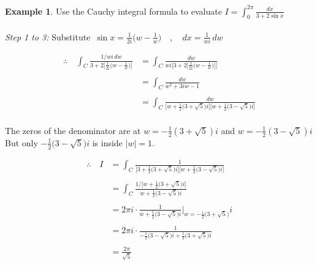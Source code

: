 \documentclass[11pt,a4paper]{article}
\theoremstyle{definition}
\newtheorem{example}[thm]{Example}
\begin{document}
\begin{example}
Use the Cauchy integral formula to evaluate $\displaystyle{I = \int^{2\pi}_0 \frac{dx}{3 + 2\sin x}}$\\


\text{\textcolor{red}{Solution}}\\
\textit{Step 1 to 3:} Substitute $\,\displaystyle{ \sin x = \frac{1}{2i}\Big(w - \frac{1}{w}\Big)\quad  , \quad  dx = \frac{1}{wi}\,dw}$


\begin{align*}
\therefore\quad  \int_C \frac{1/wi \,dw}{3 + 2\Big[\frac{1}{2i}\Big(w - \frac{1}{w}\Big)\Big]} & = \int_C \frac{dw}{wi\Big[3 + 2\Big[\frac{1}{2i}\Big(w - \frac{1}{w}\Big)\Big]\Big]}\\\\\
& = \int_C \frac{dw}{w^2 + 3iw - 1}\\\\
& = \int_C \frac{dw}{\Big[w + \frac{1}{2}\Big(3 + \sqrt{5}\Big)i\Big]\Big[w + \frac{1}{2}\Big( 3 - \sqrt{5}\Big)i\Big]}\\
\end{align*}


The zeros of the denominator are at $w = -\frac{1}{2}(3 + \sqrt{5})i$ and $w = -\frac{1}{2}(3 - \sqrt{5})i$\\

But only $-\frac{1}{2}\big(3 - \sqrt{5}\big)i$ is inside $\left|w\right| = 1$.


\begin{figure}[H]
\centering
{}
\end{figure}















\begin{align*}
\therefore\quad  I & = \int_C \frac{1}{\Big[3 + \frac{1}{2}\Big(3 + \sqrt{5}\Big)i\Big]\Big[w + \frac{1}{2}\Big(3 - \sqrt{5}\Big)i\Big]}\\\\
& = \int_C \frac{1/\Big[w + \frac{1}{2}\Big(3 + \sqrt{5}\Big)i\Big]}{w + \frac{1}{2}\Big(3 - \sqrt{5}\Big)i}\\\\
& = 2\pi i\cdot \frac{1}{w + \frac{1}{2}\Big(3 - \sqrt{5}\Big)i}\Bigg|_{w = -\frac{1}{2}\Big(3 + \sqrt{5}\Big)}i\\\\
& = 2\pi i\cdot \frac{1}{-\frac{1}{2}\Big(3- \sqrt{5}\Big)i + \frac{1}{2}\Big(3 + \sqrt{5}\Big)i}\\\\
& = \frac{2\pi}{\sqrt{5}}\\\\
\end{align*}
\end{example}
\end{document}
